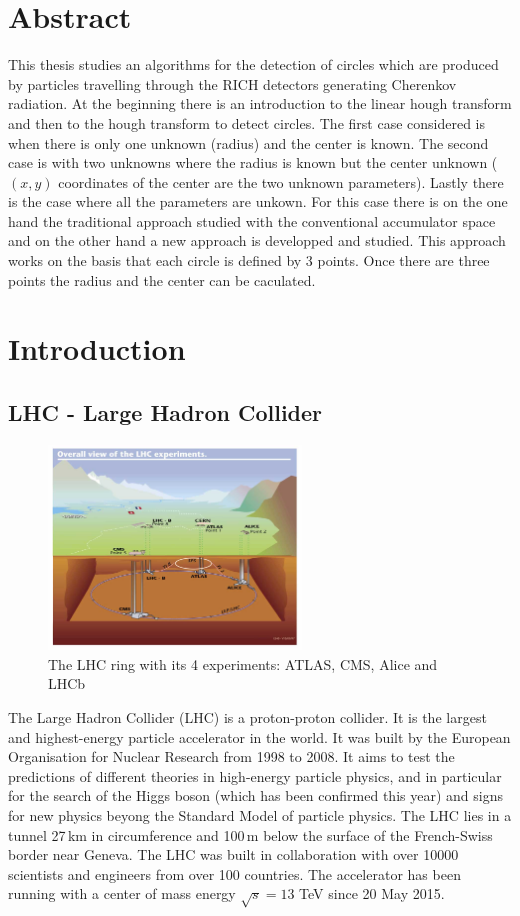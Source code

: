 \documentclass[10pt,twoside]{scrreprt}
\begin{document}
\chapter*{Abstract}
This thesis studies an algorithms for the detection of circles which are produced by particles travelling through the RICH detectors generating Cherenkov radiation.
At the beginning there is an introduction to the linear hough transform and then to the hough transform to detect circles. The first case considered
is when there is only one unknown (radius) and the center is known. The second case is with two unknowns where the radius is known but the center unknown ($(x,y)$
coordinates of the center are the two unknown parameters).
Lastly there is the case where all the parameters are unkown. For this case there is on the one hand the traditional approach studied with the conventional accumulator
space and on the other hand a new approach is developped and studied. This approach works on the basis that each circle is defined by 3 points. Once there are three
points the radius and the center can be caculated.
	

\chapter{Introduction}
\section{LHC - Large Hadron Collider} %
\label{sec:lhc_large_hadron_collider}
\begin{figure}[b]
  \centering
  \includegraphics[width=0.6\textwidth]{pics/lhc}
  \caption{The LHC ring with its 4 experiments: ATLAS, CMS, Alice and LHCb}
  \label{fig:lhc}
\end{figure}

The Large Hadron Collider (LHC) is a proton-proton collider. It is the largest and highest-energy particle accelerator in the world. It was built by the European Organisation for Nuclear Research from 1998 to 2008. It aims to test the predictions of different theories in high-energy particle physics, and in particular for the search of the Higgs boson (which has been confirmed this year) and signs for new physics beyong the Standard Model of particle physics. The LHC lies in a tunnel 27\,km in circumference and 100\,m below the surface of the French-Swiss border near Geneva. The LHC was built in collaboration with over 10000 scientists and engineers from over 100 countries. The accelerator has been running with a center of mass energy $\sqrt{s} = 13$ TeV since 20 May 2015.
\end{document}
